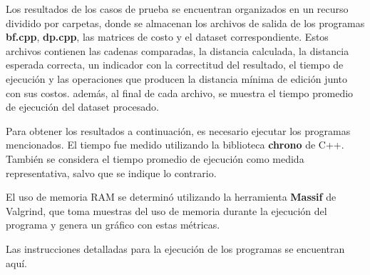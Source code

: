 
Los resultados de los casos de prueba se encuentran 
organizados en un recurso dividido por carpetas, donde 
se almacenan los archivos de salida de los programas \textbf{bf.cpp}, \textbf{dp.cpp}, las matrices
de costo y  el dataset correspondiente. Estos archivos contienen las 
cadenas comparadas, 
la distancia calculada, la distancia esperada correcta, un indicador con la correctitud
del resultado, el tiempo de ejecución y las operaciones que producen 
la distancia mínima de edición junto con sus costos. además, al final de cada archivo, 
se muestra el tiempo promedio de ejecución del dataset procesado.

Para obtener los resultados a continuación, 
es necesario ejecutar los programas mencionados.
El tiempo fue medido utilizando
la biblioteca \textbf{chrono} de C++. También se considera el tiempo promedio de ejecución 
como medida representativa, salvo que se indique lo contrario.

El uso de memoria RAM se determinó utilizando la herramienta \textbf{Massif} 
de Valgrind, que toma muestras del uso de memoria durante la ejecución del programa 
y genera un gráfico con estas métricas.

Las instrucciones detalladas para la ejecución de los programas se encuentran aquí.\cite{CodigoAlgoritmos}


